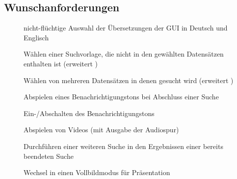 \subsection{Wunschanforderungen}
\begin{description}
	\item[] nicht-flüchtige Auswahl der Übersetzungen der GUI in Deutsch und Englisch
	\newline
	\item[] Wählen einer Suchvorlage, die nicht in den gewählten Datensätzen enthalten ist (erweitert )
	\item[] Wählen von mehreren Datensätzen in denen gesucht wird (erweitert )
	\newline
	\item[] Abspielen eines Benachrichtigungstons bei Abschluss einer Suche
	\item[] Ein-/Abschalten des Benachrichtigungstons
	\item[] Abspielen von Videos (mit Ausgabe der Audiospur)
	\item[] Durchführen einer weiteren Suche in den Ergebnissen einer bereits beendeten Suche
	\newline
	\item[] Wechsel in einen Vollbildmodus für Präsentation
\end{description}